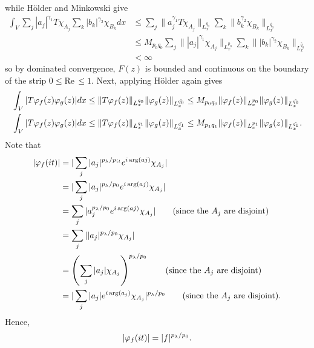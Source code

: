%
%
while H\"older and Minkowski give
%
%
\begin{equation*}
\begin{split}
	\int_{V} \sum_{j} | a_j |^{\gamma_1} T \chi_{A_j}
	\sum_{k} | b_k |^{\gamma_2} \chi_{B_k} dx
	& \le \sum_{j} \| a_j^{\gamma_1} T
	\chi_{A_j}\|_{L_x^{q_0}}  \sum_{k} \|  b_k^{\gamma_2} \chi_{B_k}
	\|_{L_x^{\tilde{q_0}}} 
	\\
	& \le M_{p_0 q_0}\sum_{j} \|| a_j |^{\gamma_1} 
	\chi_{A_j}\|_{L_x^{p_0}}  \sum_{k} \| | b_k |^{\gamma_2} \chi_{B_k}
	\|_{L_x^{\tilde{q_0}}} 
	\\
	& < \infty
\end{split}
\end{equation*}
%
%
so by dominated convergence, $F(z)$ is bounded and continuous on the boundary of
the strip $0 \le \text{Re}\, \le 1$. Next, applying H\"older again gives
%
%
\begin{equation}
\label{key-duality-est}
\begin{split}
	& \int_{V} | T \varphi_{f}(z) \varphi_{g}(z) | dx 
	\le  \|T \varphi_{f}(z)\|_{L_x^{q_0}} \|\varphi_{g}(z)\|_{L_x^{\tilde{q_0}}}
	\le M_{p_0 q_0} \|\varphi_{f}(z)\|_{L_x^{p_0}} \|\varphi_{g}(z)\|_{L_x^{\tilde{q_0}}}
	\\
	& \int_{V} | T \varphi_{f}(z) \varphi_{g}(z) | dx
	\le  \|T \varphi_{f}(z)\|_{L_x^{q_1}} \|\varphi_{g}(z)\|_{L_x^{\tilde{q_1}}}
	\le M_{p_1 q_1} \|\varphi_{f}(z)\|_{L_x^{p_1}} \|\varphi_{g}(z)\|_{L_x^{\tilde{q_1}}}.
\end{split}
\end{equation}
Note that
%
%
\begin{equation*}
\begin{split}
	| \varphi_f(it) |
	& = | \sum_{j}| a_j |^{p_\lambda / p_{it}} e^{i \arg(aj)}
	\chi_{A_j} |
	\\
	& = | \sum_{j}| a_j |^{p_\lambda / p_0} e^{i \arg(aj)}
	\chi_{A_j} |
	\\
	& =  \sum_{j}| a_j^{p_\lambda / p_0} e^{i \arg(aj)}
	\chi_{A_j} | \qquad \text{(since the $A_j$ are disjoint)}
	\\
	& = \sum_{j}| |a_j|^{p_\lambda / p_0}
	\chi_{A_j} | 
	\\
	& = \left( \sum_{j} | a_j | \chi_{A_j} \right)^{p_\lambda / p_0}
	\qquad \text{(since the $A_j$ are disjoint)}
	\\
	& = | \sum_{j} | a_j |e^{i \arg(a_j)} \chi_{A_j} |^{p_\lambda / p_0}
	\qquad \text{(since the $A_j$ are disjoint)}.
\end{split}
\end{equation*}
Hence, 
\begin{equation}
	\label{modulus-1}
\begin{split}
	| \varphi_f(it) |
	= | f |^{p_\lambda / p_0}.
\end{split}
\end{equation}
